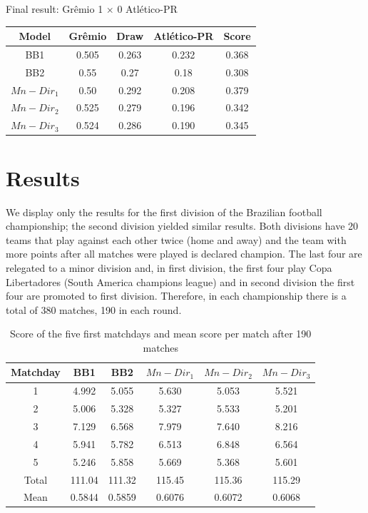 \documentclass[journal,article,accept,moreauthors,pdftex,12pt,a4paper]{mdpi}
\begin{document}
Final result: Gr\^emio 1 $\times$ 0 Atl\'etico-PR

\begin{table}[h]
\begin{center}
\begin{tabular}{ccccc}

\hline
Model & Gr\^emio & Draw & Atl\'etico-PR & Score \\
\hline
\hline
BB1 & 0.505 & 0.263 & 0.232 & 0.368 \\
BB2 & 0.55 & 0.27 & 0.18 & 0.308 \\
$Mn-Dir_1$ & 0.50 & 0.292 & 0.208 & 0.379 \\
$Mn-Dir_2$ & 0.525 & 0.279 & 0.196 & 0.342\\
$Mn-Dir_3$ & 0.524 & 0.286 & 0.190 & 0.345\\
\hline
\end{tabular}
\end{center}
\end{table}


\section{Results}
\label{sec::results}

We display only the results for the first division of the Brazilian football championship; the second
division yielded similar results.
Both divisions have 20 teams that play against each other twice (home and away) and the team with more points after all matches were played is declared champion.
The last four are relegated to a minor division and, in first division, the first four play Copa Libertadores (South America champions league) and in second division the first four are promoted to first division.
Therefore, in each championship there is a total of 380 matches, 190 in each round.

\begin{table}[H]
\begin{center}
\begin{tabular}{cccccc}

\hline
Matchday & BB1 & BB2 & $Mn-Dir_1$ & $Mn-Dir_2$ & $Mn-Dir_3$\\
\hline
\hline
1 &4.992 & 5.055 & 5.630 & 5.053 & 5.521 \\
2 &5.006 & 5.328 & 5.327 & 5.533 & 5.201 \\
3 &7.129 & 6.568 & 7.979 & 7.640 & 8.216 \\
4 &5.941 & 5.782 & 6.513 & 6.848 & 6.564 \\
5 &5.246 & 5.858 & 5.669 & 5.368 & 5.601 \\
\hline
Total & 111.04 & 111.32 & 115.45 & 115.36 & 115.29 \\
\hline
Mean & 0.5844 & 0.5859 & 0.6076 & 0.6072 & 0.6068 \\
\hline
\end{tabular}
\caption{Score of the five first matchdays and mean score per match after 190 matches}
\end{center}
\end{table}
\end{document}
